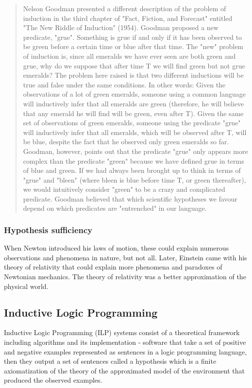 \begin{quote}
Nelson Goodman presented a different description of the problem of induction  in the third chapter of "Fact, Fiction, and Forecast" entitled "The New Riddle of Induction" (1954). Goodman proposed a new predicate, "grue". Something is grue if and only if it has been observed to be green before a certain time or blue after that time. The "new" problem of induction is, since all emeralds we have ever seen are both green and grue, why do we suppose that after time T we will find green but not grue emeralds? The problem here raised is that two different inductions will be true and false under the same conditions. In other words:
Given the observations of a lot of green emeralds, someone using a common language will inductively infer that all emeralds are green (therefore, he will believe that any emerald he will find will be green, even after T).
Given the same set of observations of green emeralds, someone using the predicate "grue" will inductively infer that all emeralds, which will be observed after T, will be blue, despite the fact that he observed only green emeralds so far.
Goodman, however, points out that the predicate "grue" only appears more complex than the predicate "green" because we have defined grue in terms of blue and green. If we had always been brought up to think in terms of "grue" and "bleen" (where bleen is blue before time T, or green thereafter), we would intuitively consider "green" to be a crazy and complicated predicate. Goodman believed that which scientific hypotheses we favour depend on which predicates are "entrenched" in our language.
\end{quote}

\subsubsection{Hypothesis sufficiency}
When Newton introduced his laws of motion, these could explain numerous observations and phenomena in nature, but not all. Later, Einstein came with his theory of relativity that could explain more phenomena and paradoxes of Newtonian mechanics. The theory of relativity was a better approximation of the physical world.

\subsection{Inductive Logic Programming}
Inductive Logic Programming (ILP) systems consist of a theoretical framework including algorithms and its implementation - software that take a set of positive and negative examples represented as sentences in a logic programming language, then they output a set of sentences called a hypothesis which is a finite axiomatization of the theory of the approximated model of the environment that produced the observed examples.

